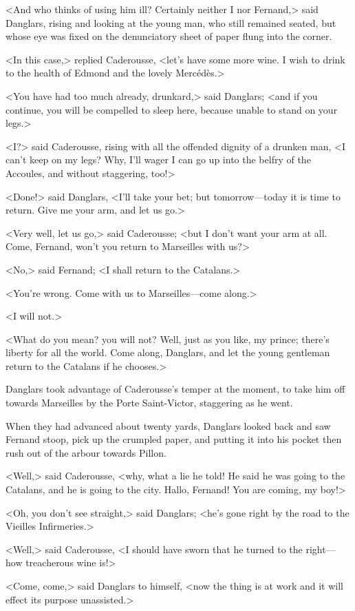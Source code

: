  <And who thinks of using him ill? Certainly neither I nor Fernand,> said Danglars, rising and looking at the young man, who still remained seated, but whose eye was fixed on the denunciatory sheet of paper flung into the corner. 

 <In this case,> replied Caderousse, <let's have some more wine. I wish to drink to the health of Edmond and the lovely Mercédès.> 

 <You have had too much already, drunkard,> said Danglars; <and if you continue, you will be compelled to sleep here, because unable to stand on your legs.> 

 <I?> said Caderousse, rising with all the offended dignity of a drunken man, <I can't keep on my legs? Why, I'll wager I can go up into the belfry of the Accoules, and without staggering, too!> 

 <Done!> said Danglars, <I'll take your bet; but tomorrow—today it is time to return. Give me your arm, and let us go.> 

 <Very well, let us go,> said Caderousse; <but I don't want your arm at all. Come, Fernand, won't you return to Marseilles with us?> 

 <No,> said Fernand; <I shall return to the Catalans.> 

 <You're wrong. Come with us to Marseilles—come along.> 

 <I will not.> 

 <What do you mean? you will not? Well, just as you like, my prince; there's liberty for all the world. Come along, Danglars, and let the young gentleman return to the Catalans if he chooses.> 

 Danglars took advantage of Caderousse's temper at the moment, to take him off towards Marseilles by the Porte Saint-Victor, staggering as he went. 

 When they had advanced about twenty yards, Danglars looked back and saw Fernand stoop, pick up the crumpled paper, and putting it into his pocket then rush out of the arbour towards Pillon. 

 <Well,> said Caderousse, <why, what a lie he told! He said he was going to the Catalans, and he is going to the city. Hallo, Fernand! You are coming, my boy!> 

 <Oh, you don't see straight,> said Danglars; <he's gone right by the road to the Vieilles Infirmeries.> 

 <Well,> said Caderousse, <I should have sworn that he turned to the right—how treacherous wine is!> 

 <Come, come,> said Danglars to himself, <now the thing is at work and it will effect its purpose unassisted.> 